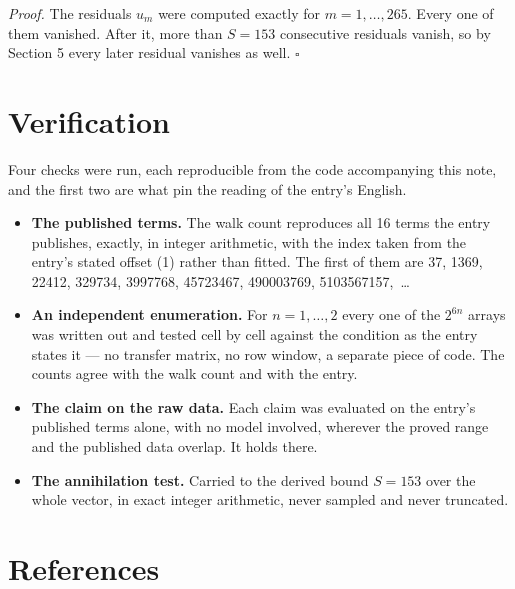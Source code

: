 \documentclass[11pt]{article}
\theoremstyle{definition}
\begin{document}
{\itshape Proof.} The residuals $u_m$ were computed exactly for $m = 1,\dots,265$. Every one of them vanished. After it, more than $S = 153$ consecutive residuals vanish, so by Section 5 every later residual vanishes as well. $\square$

\section{Verification}

Four checks were run, each reproducible from the code accompanying this note, and the first two are what pin the reading of the entry's English.

\begin{itemize}

\item {\bfseries The published terms.} The walk count reproduces all 16 terms the entry publishes, exactly, in integer arithmetic, with the index taken from the entry's stated offset (1) rather than fitted. The first of them are 37, 1369, 22412, 329734, 3997768, 45723467, 490003769, 5103567157,~\dots

\item {\bfseries An independent enumeration.} For $n = 1,\dots,2$ every one of the $2^{6n}$ arrays was written out and tested cell by cell against the condition as the entry states it --- no transfer matrix, no row window, a separate piece of code. The counts agree with the walk count and with the entry.

\item {\bfseries The claim on the raw data.} Each claim was evaluated on the entry's published terms alone, with no model involved, wherever the proved range and the published data overlap. It holds there.

\item {\bfseries The annihilation test.} Carried to the derived bound $S = 153$ over the whole vector, in exact integer arithmetic, never sampled and never truncated.

\end{itemize}

\section{References}
\end{document}
